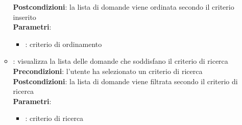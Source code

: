 \begin{itemize}
\begin{itemize}
			\textbf{Postcondizioni}: la lista di domande viene ordinata secondo il criterio inserito\\
			\textbf{Parametri}:
				\begin{itemize}
					\item{}: criterio di ordinamento\\
				\end{itemize}
		\item{}: visualizza la lista delle domande che soddisfano il criterio di ricerca \\
			\textbf{Precondizioni}: l'utente ha selezionato un criterio di ricerca\\
			\textbf{Postcondizioni}: la lista di domande viene filtrata secondo il criterio di ricerca\\
			\textbf{Parametri}:
				\begin{itemize}
					\item{}: criterio di ricerca\\
				\end{itemize}
	\end{itemize}
\end{itemize}

